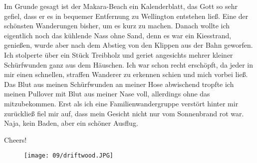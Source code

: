 Im Grunde gesagt ist der Makara-Beach ein Kalenderblatt, das Gott so
sehr gefiel, dass er es in bequemer Entfernung zu Wellington entstehen
ließ. Eine der schönsten Wanderungen bisher, um es kurz zu machen.
Danach wollte ich eigentlich noch das kühlende Nass ohne Sand, denn es
war ein Kiesstrand, genießen, wurde aber nach dem Abstieg von den
Klippen aus der Bahn geworfen. Ich stolperte über ein Stück Treibholz
und geriet angesichts mehrer kleiner Schürfwunden ganz aus dem Häuschen.
Ich war schon recht erschöpft, da jeder in mir einen schnellen, straffen
Wanderer zu erkennen schien und mich vorbei ließ. Das Blut aus meinen
Schürfwunden an meiner Hose abwischend tropfte ich meinen Pullover mit
Blut aus meiner Nase voll, allerdings ohne das mitzubekommen. Erst als
ich eine Familienwandergruppe verstört hinter mir zurückließ fiel mir
auf, dass mein Gesicht nicht nur vom Sonnenbrand rot war. Naja, kein
Baden, aber ein schöner Ausflug.

Cheers!
\begin{figure}[p]
  \centering
  \texttt{[image: 09/driftwood.JPG]}
\end{figure}
